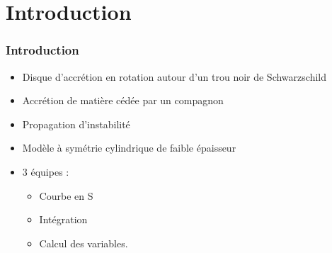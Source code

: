 \section{Introduction}
\begin{frame}
	\frametitle{Introduction}
	
	\begin{itemize}
	    \item Disque d'accrétion en rotation autour d'un trou noir de Schwarzschild
	    \item Accrétion de matière cédée par un compagnon
	    \item Propagation d'instabilité
	    \item Modèle à symétrie cylindrique de faible épaisseur
	    \item 3 équipes :
	    \begin{itemize}
	        \item Courbe en S
	        \item Intégration
	        \item Calcul des variables.
	    \end{itemize}
	\end{itemize}
\end{frame}